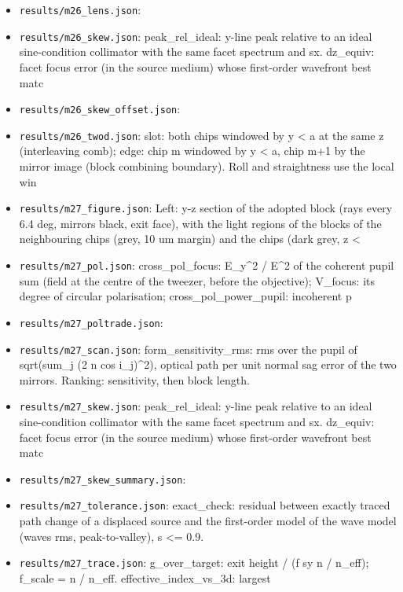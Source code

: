 \begin{itemize}
  distance at which the light the pupil ac
\item
  \texttt{results/m26\_lens.json}:
\item
  \texttt{results/m26\_skew.json}: peak\_rel\_ideal: y-line peak
  relative to an ideal sine-condition collimator with the same facet
  spectrum and sx. dz\_equiv: facet focus error (in the source medium)
  whose first-order wavefront best matc
\item
  \texttt{results/m26\_skew\_offset.json}:
\item
  \texttt{results/m26\_twod.json}: slot: both chips windowed by
  \textbar y\textbar{} \textless{} a at the same z (interleaving comb);
  edge: chip m windowed by y \textless{} a, chip m+1 by the mirror image
  (block combining boundary). Roll and straightness use the local win
\item
  \texttt{results/m27\_figure.json}: Left: y-z section of the adopted
  block (rays every 6.4 deg, mirrors black, exit face), with the light
  regions of the blocks of the neighbouring chips (grey, 10 um margin)
  and the chips (dark grey, z \textless{}
\item
  \texttt{results/m27\_pol.json}: cross\_pol\_focus:
  \textbar E\_y\textbar\^{}2 / \textbar E\textbar\^{}2 of the coherent
  pupil sum (field at the centre of the tweezer, before the objective);
  V\_focus: its degree of circular polarisation;
  cross\_pol\_power\_pupil: incoherent p
\item
  \texttt{results/m27\_poltrade.json}:
\item
  \texttt{results/m27\_scan.json}: form\_sensitivity\_rms: rms over the
  pupil of sqrt(sum\_j (2 n cos i\_j)\^{}2), optical path per unit
  normal sag error of the two mirrors. Ranking: sensitivity, then block
  length.
\item
  \texttt{results/m27\_skew.json}: peak\_rel\_ideal: y-line peak
  relative to an ideal sine-condition collimator with the same facet
  spectrum and sx. dz\_equiv: facet focus error (in the source medium)
  whose first-order wavefront best matc
\item
  \texttt{results/m27\_skew\_summary.json}:
\item
  \texttt{results/m27\_tolerance.json}: exact\_check: residual between
  exactly traced path change of a displaced source and the first-order
  model of the wave model (waves rms, peak-to-valley),
  \textbar s\textbar{} \textless= 0.9.
\item
  \texttt{results/m27\_trace.json}: g\_over\_target: exit height / (f sy
  n / n\_eff); f\_scale = n / n\_eff. effective\_index\_vs\_3d: largest

\end{itemize}
